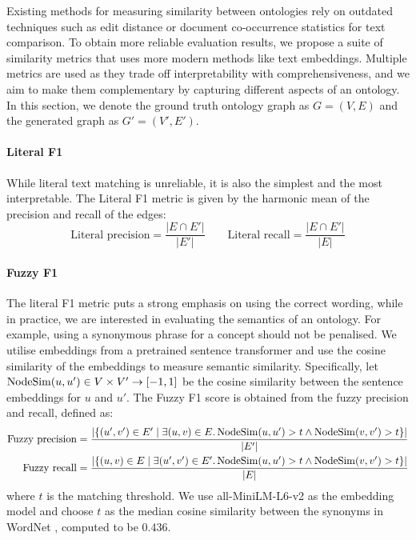 Existing methods for measuring similarity between ontologies rely on outdated techniques such as edit distance or document co-occurrence statistics for text comparison. To obtain more reliable evaluation results, we propose a suite of similarity metrics that uses more modern methods like text embeddings. Multiple metrics are used as they trade off interpretability with comprehensiveness, and we aim to make them complementary by capturing different aspects of an ontology. In this section, we denote the ground truth ontology graph as $G = (V, E)$ and the generated graph as $G' = (V', E')$.

\paragraph{Literal F1 \cite{Kashyap2005TaxaMinerAE}}
While literal text matching is unreliable, it is also the simplest and the most interpretable. The Literal F1 metric is given by the harmonic mean of the precision and recall of the edges:
\[
    \text{Literal precision} = \frac{|E \cap E'|}{|E'|} \qquad
    \text{Literal recall} = \frac{|E \cap E'|}{|E|}
\]

\paragraph{Fuzzy F1}
The literal F1 metric puts a strong emphasis on using the correct wording, while in practice, we are interested in evaluating the semantics of an ontology. For example, using a synonymous phrase for a concept should not be penalised. We utilise embeddings from a pretrained sentence transformer and use the cosine similarity of the embeddings to measure semantic similarity. Specifically, let $\operatorname{NodeSim}(u, u') \in V \times V' \to [-1, 1]$ be the cosine similarity between the sentence embeddings for $u$ and $u'$. The Fuzzy F1 score is obtained from the fuzzy precision and recall, defined as:
\begin{equation*}
    \begin{aligned}
        \text{Fuzzy precision} & = \frac{|
            \{(u', v') \in E' \mid \exists (u, v) \in E.
            \operatorname{NodeSim}(u, u') > t \land \operatorname{NodeSim}(v, v') > t
            \}
        |}{|E'|}                           \\
        \text{Fuzzy recall}    & = \frac{|
            \{(u, v) \in E \mid \exists (u', v') \in E'.
            \operatorname{NodeSim}(u, u') > t \land \operatorname{NodeSim}(v, v') > t
            \}
        |}{|E|}                            \\
    \end{aligned}
\end{equation*}
where $t$ is the matching threshold. We use all-MiniLM-L6-v2 \cite{wang2020minilm,reimers-2019-sentence-bert} as the embedding model and choose $t$ as the median cosine similarity between the synonyms in WordNet \cite{miller1995wordnet}, computed to be 0.436.

